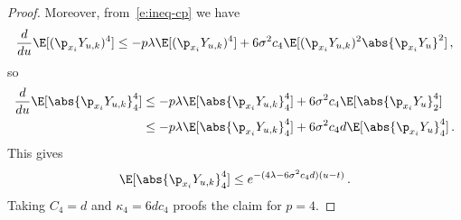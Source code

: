 \documentclass{amsart}
\begin{document}
\begin{proof}
	Moreover, from~\eqref{e:ineq-cp} we have 
	\begin{equation*}
		\frac{d}{du} \E [(\p_{x_i} Y_{u,k})^4] \le -p\lambda \E[(\p_{x_i} Y_{u,k})^4] + 6 \sigma^2 c_4 \E [(\p_{x_i} Y_{u,k})^2 \abs{\p_{x_i} Y_u}^2] \,,
	\end{equation*}
	so 
	\begin{align*}
		\frac{d}{du} \E [\abs{\p_{x_i} Y_{u,k}}_4^4] & \le -p\lambda \E[\abs{\p_{x_i} Y_{u,k}}_4^4] + 6 \sigma^2 c_4 \E [\abs{\p_{x_i} Y_u}_2^4] \\
		& \le  -p\lambda \E[\abs{\p_{x_i} Y_{u,k}}_4^4] + 6 \sigma^2 c_4 d \E [\abs{\p_{x_i} Y_u}_4^4] \,.
	\end{align*}
	This gives 
	\begin{equation*}
		\E [\abs{\p_{x_i} Y_{u,k}}_4^4] \le e^{-(4\lambda - 6\sigma^2 c_4 d) (u-t)} \,.
	\end{equation*}
	Taking $C_4 = d$ and $\kappa_4 = 6dc_4$ proofs the claim for $p=4$.
\end{proof}
\end{document}
